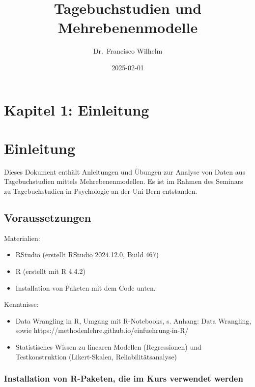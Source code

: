 \documentclass[
  letterpaper,
  DIV=11,
  numbers=noendperiod]{scrreprt}
\title{Tagebuchstudien und Mehrebenenmodelle}
\author{Dr.~Francisco Wilhelm}
\date{2025-02-01}
\providecommand{\tightlist}{%
  \setlength{\itemsep}{0pt}\setlength{\parskip}{0pt}}\usepackage{longtable,booktabs,array}
\renewcommand*\contentsname{Table of contents}
\newcommand\contentsname{Table of contents}
\begin{document}
\maketitle

\renewcommand*\contentsname{Table of contents}
{
\hypersetup{linkcolor=}
\setcounter{tocdepth}{2}
\tableofcontents
}


\chapter{Kapitel 1: Einleitung}\label{kapitel-1-einleitung}


\chapter{Einleitung}\label{einleitung}

Dieses Dokument enthält Anleitungen und Übungen zur Analyse von Daten
aus Tagebuchstudien mittels Mehrebenenmodellen. Es ist im Rahmen des
Seminars zu Tagebuchstudien in Psychologie an der Uni Bern entstanden.

\section{Voraussetzungen}\label{voraussetzungen}

Materialien:

\begin{itemize}
\tightlist
\item
  RStudio (erstellt RStudio 2024.12.0, Build 467)
\item
  R (erstellt mit R 4.4.2)
\item
  Installation von Paketen mit dem Code unten.
\end{itemize}

Kenntnisse:

\begin{itemize}
\tightlist
\item
  Data Wrangling in R, Umgang mit R-Notebooks, s. Anhang: Data
  Wrangling, sowie https://methodenlehre.github.io/einfuehrung-in-R/
\item
  Statistisches Wissen zu linearen Modellen (Regressionen) und
  Testkonstruktion (Likert-Skalen, Reliabilitätsanalyse)
\end{itemize}

\subsection{Installation von R-Paketen, die im Kurs verwendet
werden}\label{installation-von-r-paketen-die-im-kurs-verwendet-werden}
\end{document}
